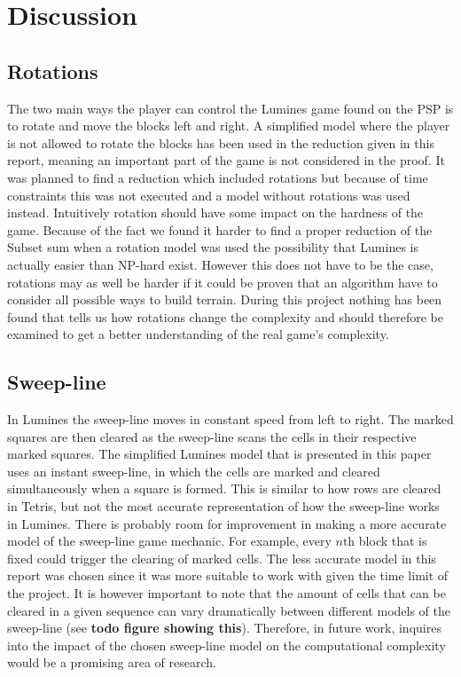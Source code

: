 \section{Discussion}
\label{discussion}

\subsection{Rotations}

The two main ways the player can control the Lumines game found on the PSP is to rotate and move the blocks left and right. A simplified model where the player is not allowed to rotate the blocks has been used in the reduction given in this report, meaning an important part of the game is not considered in the proof. It was planned to find a reduction which included rotations but because of time constraints this was not executed and a model without rotations was used instead. Intuitively rotation should have some impact on the hardness of the game. Because of the fact we found it harder to find a proper reduction of the Subset sum when a rotation model was used the possibility that Lumines is actually easier than NP-hard exist. However this does not have to be the case, rotations may as well be harder if it could be proven that an algorithm have to consider all possible ways to build terrain. During this project nothing has been found that tells us how rotations change the complexity and should therefore be examined to get a better understanding of the real game's complexity.

\subsection{Sweep-line}

In Lumines the sweep-line moves in constant speed from left to right. The marked squares are then cleared as the sweep-line scans the cells in their respective marked squares. The simplified Lumines model that is presented in this paper uses an instant sweep-line, in which the cells are marked and cleared simultaneously when a square is formed. This is similar to how rows are cleared in Tetris, but not the most accurate representation of how the sweep-line works in Lumines. There is probably room for improvement in making a more accurate model of the sweep-line game mechanic. For example, every $n\text{th}$ block that is fixed could trigger the clearing of marked cells. The less accurate model in this report was chosen since it was more suitable to work with given the time limit of the project. It is however important to note that the amount of cells that can be cleared in a given sequence can vary dramatically between different models of the sweep-line (see \textbf{todo figure showing this}). Therefore, in future work, inquires into the impact of the chosen sweep-line model on the computational complexity would be a promising area of research.

